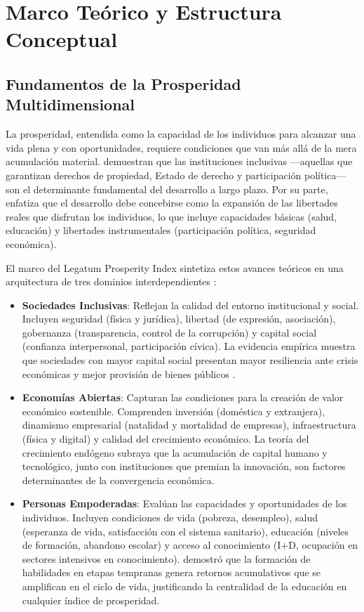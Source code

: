\documentclass[authoryear,12pt]{elsarticle}
\begin{document}
\section{Marco Teórico y Estructura Conceptual}

\subsection{Fundamentos de la Prosperidad Multidimensional}

La prosperidad, entendida como la capacidad de los individuos para alcanzar una vida plena y con oportunidades, requiere condiciones que van más allá de la mera acumulación material. \citet{acemoglu2012why} demuestran que las instituciones inclusivas —aquellas que garantizan derechos de propiedad, Estado de derecho y participación política— son el determinante fundamental del desarrollo a largo plazo. Por su parte, \citet{sen1999development} enfatiza que el desarrollo debe concebirse como la expansión de las libertades reales que disfrutan los individuos, lo que incluye capacidades básicas (salud, educación) y libertades instrumentales (participación política, seguridad económica).

El marco del Legatum Prosperity Index sintetiza estos avances teóricos en una arquitectura de tres dominios interdependientes \citep{legatum2024methodology}:

\begin{itemize}
    \item \textbf{Sociedades Inclusivas}: Reflejan la calidad del entorno institucional y social. Incluyen seguridad (física y jurídica), libertad (de expresión, asociación), gobernanza (transparencia, control de la corrupción) y capital social (confianza interpersonal, participación cívica). La evidencia empírica muestra que sociedades con mayor capital social presentan mayor resiliencia ante crisis económicas \citep{putnam1993making} y mejor provisión de bienes públicos \citep{knack1997does}.

    \item \textbf{Economías Abiertas}: Capturan las condiciones para la creación de valor económico sostenible. Comprenden inversión (doméstica y extranjera), dinamismo empresarial (natalidad y mortalidad de empresas), infraestructura (física y digital) y calidad del crecimiento económico. La teoría del crecimiento endógeno \citep{romer1990endogenous} subraya que la acumulación de capital humano y tecnológico, junto con instituciones que premian la innovación, son factores determinantes de la convergencia económica.

    \item \textbf{Personas Empoderadas}: Evalúan las capacidades y oportunidades de los individuos. Incluyen condiciones de vida (pobreza, desempleo), salud (esperanza de vida, satisfacción con el sistema sanitario), educación (niveles de formación, abandono escolar) y acceso al conocimiento (I+D, ocupación en sectores intensivos en conocimiento). \citet{heckman2006skill} demostró que la formación de habilidades en etapas tempranas genera retornos acumulativos que se amplifican en el ciclo de vida, justificando la centralidad de la educación en cualquier índice de prosperidad.
\end{itemize}
\end{document}
